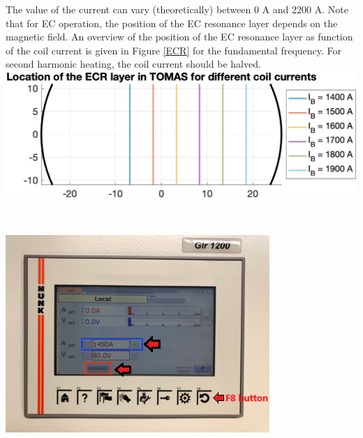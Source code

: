 \documentclass[fleqn,a4paper,20pt]{article}
\begin{document}
\begin{minipage}{.48\textwidth}
The value of the current can vary (theoretically) between 0 A and 2200 A. Note that for EC operation, the position of the EC resonance layer depends on the magnetic field.  An overview of the position of the EC resonance layer as function of the coil current is given in Figure \ref{ECR} for the fundamental frequency. For second harmonic heating, the coil current should be halved.\\

\includegraphics[width=0.98\linewidth]{ECR}
\captionsetup{width=0.75\textwidth}
\label{ECR}

\end{minipage}
\begin{minipage}{.02\textwidth}
$\ $\\
\end{minipage}
\begin{minipage}{.5\textwidth}
\centering
\includegraphics[width=0.98\linewidth]{Coil2}
\captionsetup{width=0.75\textwidth}
\label{Coil1}
\end{minipage}
\end{document}
